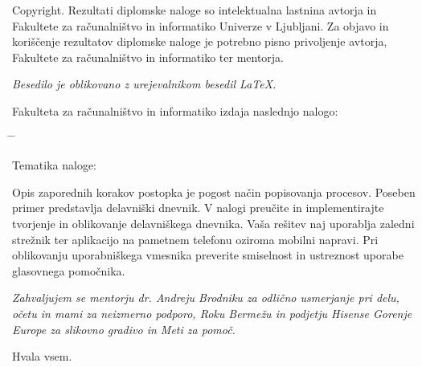 \documentclass[a4paper, 12pt]{book}
\newcommand{\clearemptydoublepage}{\newpage{\pagestyle{empty}\cleardoublepage}}
\begin{document}
\noindent
{\sc Copyright}. 
Rezultati diplomske naloge so intelektualna lastnina avtorja in Fakultete za računalništvo in informatiko Univerze v Ljubljani.
Za objavo in koriščenje rezultatov diplomske naloge je potrebno pisno privoljenje avtorja, Fakultete za računalništvo in informatiko ter mentorja.

\begin{center}
\mbox{}\vfill
\emph{Besedilo je oblikovano z urejevalnikom besedil \LaTeX.}
\end{center}
\clearemptydoublepage

\thispagestyle{empty}
\vspace*{4cm}

\noindent
Fakulteta za računalništvo in informatiko izdaja naslednjo nalogo:
\medskip
\begin{tabbing}
\hspace{32mm}\= \hspace{6cm} \= \kill




Tematika naloge:
\end{tabbing}
Opis zaporednih korakov postopka je pogost način popisovanja procesov. Poseben primer predstavlja delavniški dnevnik. V nalogi preučite in implementirajte tvorjenje in oblikovanje delavniškega dnevnika. Vaša rešitev naj uporablja zaledni strežnik ter aplikacijo na pametnem telefonu oziroma mobilni napravi. Pri oblikovanju uporabniškega vmesnika preverite smiselnost in ustreznost uporabe glasovnega pomočnika.
\vspace{15mm}



\vspace{2cm}

\clearemptydoublepage

\thispagestyle{empty}\mbox{}\vfill\null\it%
\noindent
Zahvaljujem se mentorju dr. Andreju Brodniku za odlično usmerjanje pri delu, očetu in mami za neizmerno podporo, Roku Bermežu in podjetju Hisense Gorenje Europe za slikovno gradivo in Meti za pomoč.

Hvala vsem.
\rm\normalfont

\clearemptydoublepage
\end{document}
